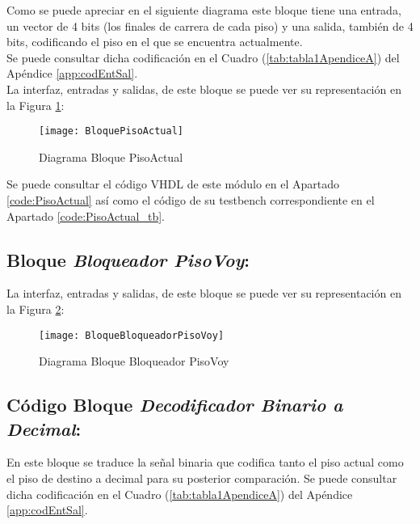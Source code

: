     Como se puede apreciar en el siguiente diagrama este bloque tiene una entrada, un vector de 4 bits (los finales de carrera de cada piso) y una salida, también de 4 bits, codificando el piso en el que se encuentra actualmente. \\ 
    
    Se puede consultar dicha codificación en el Cuadro (\ref{tab:tabla1ApendiceA}) del Apéndice \ref{app:codEntSal}. \\ 
    
    La interfaz, entradas y salidas, de este bloque se puede ver su representación en la Figura \ref{fig:BloquePisoActual}:
    
    \begin{figure}[H]
		    \centering
		    \hspace*{-1.8cm}
		    \texttt{[image: BloquePisoActual]}
		    \caption{Diagrama Bloque PisoActual}
		    \label{fig:BloquePisoActual}
	\end{figure}
	
	Se puede consultar el código VHDL de este módulo en el Apartado \ref{code:PisoActual} así como el código de su testbench correspondiente en el Apartado \ref{code:PisoActual_tb}.

\subsection{Bloque \textit{Bloqueador PisoVoy}:}
    
    La interfaz, entradas y salidas, de este bloque se puede ver su representación en la Figura \ref{fig:BloqueBloqueadorPisoVoy}:
    
    
    \begin{figure}[H]
		    \centering
		    \hspace*{-1.8cm}
		    \texttt{[image: BloqueBloqueadorPisoVoy]}
		    \caption{Diagrama Bloque Bloqueador PisoVoy}
		    \label{fig:BloqueBloqueadorPisoVoy}
	\end{figure}
	
\subsection{Código Bloque \textit{Decodificador Binario a Decimal}:} 
	En este bloque se traduce la señal binaria que codifica tanto el piso actual como el piso de destino a decimal para su posterior comparación.
	Se puede consultar dicha codificación en el Cuadro (\ref{tab:tabla1ApendiceA}) del Apéndice \ref{app:codEntSal}. \\ 
	
